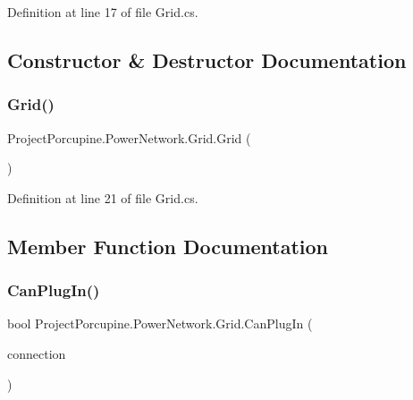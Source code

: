 Definition at line 17 of file Grid.\+cs.



\subsection{Constructor \& Destructor Documentation}
\mbox{\label{class_project_porcupine_1_1_power_network_1_1_grid_a9a6675ff50fe5939bc19ebdf49e4aa87}} 
\subsubsection{\texorpdfstring{Grid()}{Grid()}}
{\footnotesize\ttfamily Project\+Porcupine.\+Power\+Network.\+Grid.\+Grid (\begin{DoxyParamCaption}{ }\end{DoxyParamCaption})}



Definition at line 21 of file Grid.\+cs.



\subsection{Member Function Documentation}
\mbox{\label{class_project_porcupine_1_1_power_network_1_1_grid_ad9f6231845db898ab5cefb659ba38572}} 
\subsubsection{\texorpdfstring{Can\+Plug\+In()}{CanPlugIn()}}
{\footnotesize\ttfamily bool Project\+Porcupine.\+Power\+Network.\+Grid.\+Can\+Plug\+In (\begin{DoxyParamCaption}\item[{\hyperlink{interface_project_porcupine_1_1_power_network_1_1_i_pluggable}{I\+Pluggable}}]{connection }\end{DoxyParamCaption})}



